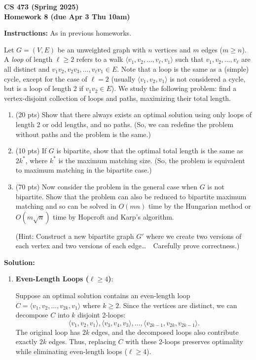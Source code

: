 \documentclass[11pt]{article}
\begin{document}
\begin{center}\Large\bf 
CS 473 (Spring 2025)\\
Homework 8 (due Apr 3 Thu 10am)
\end{center}

\medskip\noindent
{\bf Instructions:} As in previous homeworks.

\begin{description}

\bigskip
\item[Problem 7.1:]
Let $G=(V,E)$ be an unweighted graph with $n$ vertices and $m$ edges ($m\ge n$).
A \emph{loop} of length $\ell\ge 2$ refers to a walk $\langle v_1,v_2,\ldots,v_\ell,v_1\rangle$
such that $v_1,v_2,\ldots,v_\ell$ are all distinct and $v_1v_2,v_2v_3,\ldots,v_\ell v_1\in E$.  Note that a loop is the same as a (simple) cycle, except for the case of $\ell=2$ (usually $\langle v_1,v_2,v_1\rangle$ is not considered a cycle, but is a loop of length 2 if $v_1v_2\in E$).
We study the following problem: find a vertex-disjoint collection of loops and paths, maximizing their total length.

\begin{enumerate}
\item[(a)] (20 pts) Show that there always exists an optimal solution using only loops of length 2 or odd lengths, and no paths.  (So, we can redefine the problem without paths and the problem is the same.)  
\item[(b)] (10 pts) If $G$ is bipartite, show that the optimal total length is the same as $2k^*$, where $k^*$ is the maximum matching size.  (So, the problem is equivalent to maximum matching in the bipartite case.)
\item[(c)] (70 pts) Now consider the problem in the general case when $G$ is not bipartite.
Show that the problem can also be reduced to bipartite maximum matching and so
can be solved in $O(mn)$ time by the Hungarian method or $O(m\sqrt{n})$ time by
Hopcroft and Karp's algorithm.

(Hint: Construct a new bipartite graph $G'$ where we create two versions of each vertex and
two versions of each edge\ldots\ \ Carefully prove correctness.)
\end{enumerate}

\newpage
\textbf{Solution:}
\begin{enumerate}
  \item[(a)]
  \textbf{Even-Length Loops (\(\ell \ge 4\))}:

  Suppose an optimal solution contains an even-length loop \( C = \langle v_1, v_2, \dots, v_{2k}, v_1 \rangle \) where \( k \ge 2 \). Since the vertices are distinct, we can decompose \( C \) into \( k \) disjoint 2-loops:
  \[
  \langle v_1, v_2, v_1 \rangle, \langle v_3, v_4, v_3 \rangle, \dots, \langle v_{2k-1}, v_{2k}, v_{2k-1} \rangle.
  \]
  The original loop has \( 2k \) edges, and the decomposed loops also contribute exactly \( 2k \) edges. Thus, replacing \( C \) with these 2-loops preserves optimality while eliminating even-length loops (\(\ell \ge 4\)).


\end{enumerate}
\end{description}
\end{document}
